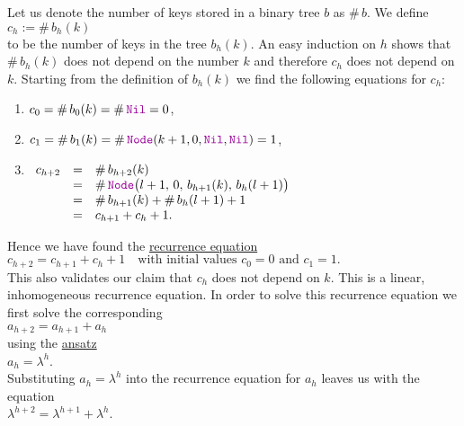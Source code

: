 Let us denote the number of keys stored in a binary tree $b$ as  $\#\,b$.  We define
\\[0.2cm]
\hspace*{1.3cm}
$c_h := \#\, b_h(k)$
\\[0.2cm]
to be the number of keys in the tree $b_h(k)$.  An easy induction on $h$ shows that 
$\#\,b_h(k)$ does not depend on the number $k$ and therefore $c_h$ does not depend on $k$.  Starting
from the definition of $b_h(k)$ we find the following equations for $c_h$:
\begin{enumerate}
\item $c_0 = \#\, b_0(k) = \#\, \mytt{Nil} = 0$,
\item $c_1 = \#\, b_1(k) = \#\, \mytt{Node}(k+1,0,\mytt{Nil}, \mytt{Nil}) = 1$, 
\item$\begin{array}[t]{lcl}
       c_{h+2} & = & \#\, b_{h+2}(k) \\
               & = & \#\,\mytt{Node}\bigl(l+1,\,0,\,b_{h+1}(k),\,b_h(l+1)\bigr) \\
               & = & \#\, b_{h+1}(k) + \#\, b_h(l+1) + 1 \\
               & = & c_{h+1} + c_h + 1.
       \end{array}$
\end{enumerate}
Hence we have found the \href{https://en.wikipedia.org/wiki/Recurrence_relation}{recurrence equation}
\\[0.2cm]
\hspace*{1.3cm}
$c_{h+2} = c_{h+1} + c_h + 1 \quad \mbox{with initial values $c_0 = 0$ and $c_1 = 1$}.$
\\[0.2cm]
This also validates our claim that $c_h$ does not depend on $k$.  This is a linear, inhomogeneous recurrence
equation.  In order to solve this recurrence
equation we first solve the corresponding  
\\[0.2cm]
\hspace*{1.3cm}
$a_{h+2} = a_{h+1} + a_h$
\\[0.2cm]
using the \href{https://en.wikipedia.org/wiki/Ansatz}{ansatz}
\\[0.2cm]
\hspace*{1.3cm}
$a_h = \lambda^h$.
\\[0.2cm]
Substituting $a_h = \lambda^h$ into the recurrence equation for $a_h$ leaves us with the equation
\\[0.2cm]
\hspace*{1.3cm}
$\lambda^{h+2} = \lambda^{h+1} + \lambda^{h}$.
